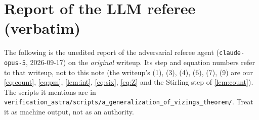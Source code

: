 \documentclass[11pt,a4paper]{article}
\theoremstyle{plain}
\theoremstyle{definition}
\theoremstyle{remark}
\begin{document}
\section{Report of the LLM referee (verbatim)}\label{app:referee}

\begin{tcolorbox}[colback=gray!8,colframe=gray!50,boxrule=0.4pt,arc=2pt]
\small The following is the unedited report of the adversarial referee agent (\texttt{claude-opus-5}, 2026-09-17) on the \emph{original} writeup. Its step and equation numbers refer to that writeup, not to this note (the writeup's (1), (3), (4), (6), (7), (9) are our \eqref{eq:count}, \eqref{eq:pm}, \cref{lem:int}, \eqref{eq:six}, \eqref{eq:Z} and the Stirling step of \cref{lem:count}). The scripts it mentions are in \texttt{verification\_astra/scripts/a\_generalization\_of\_vizings\_theorem/}. Treat it as machine output, not as an authority.
\end{tcolorbox}

\begingroup
\let\*\ast

\endgroup
\end{document}

